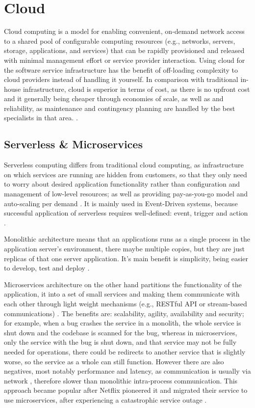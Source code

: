 \section{Cloud}
Cloud computing is a model for enabling convenient, on-demand network access to a shared pool of configurable computing
resources (e.g., networks, servers, storage, applications, and services) that can be rapidly provisioned and released with minimal management effort or service provider interaction. \cite {cloudDef}
Using cloud for the software service infrastructure has the benefit of off-loading complexity to cloud providers instead of handling it yourself. In comparison with traditional in-house infrastructure, cloud is superior in terms of cost, as there is no upfront cost and it generally being cheaper through economies of scale, as well as and reliability, as maintenance and contingency planning are handled by the best specialists in that area.  \cite{armbrust2009above, hajjat2010cloudward}.  
\subsection{Serverless \& Microservices}
Serverless computing differs from traditional cloud computing, as infrastructure on which services are running are hidden from customers, so that they only need to worry about desired application functionality rather than configuration and management of low-level resources; as well as providing pay-as-you-go model and auto-scaling per demand \cite{serverless1}.  It is mainly used in Event-Driven systems, because successful application of serverless requires well-defined: event, trigger and action \cite{MALAWSKI2020502, serverless2}. 

Monolithic architecture means that an applications runs as a single process in the application server's environment, there maybe multiple copies, but they are just replicas of that one server application. It's main benefit is simplicity, being easier to develop, test and deploy \cite{monolith}.

Microservices architecture on the other hand partitions the functionality of the application, it into a set of small services and making them communicate with each other through light weight mechanisms (e.g., RESTful API or stream-based communications) \cite{fowler2014eb}. The benefits are: scalability, agility, availability and security; for example, when a bug crashes the service in a monolith, the whole service is shut down and the codebase is scanned for the bug, whereas in microservices, only the service with the bug is shut down, and that service may not be fully needed for operations, there could be redirects to another service that is slightly worse, so the service as a whole can still function. However there are also negatives, most notably performance and latency, as communication is usually via network \cite{Li2021Understanding}, therefore slower than monolithic intra-process communication. This approach became popular after Netflix pioneered it and migrated their service to use microservices, after experiencing a catastrophic service outage \cite{monolith}.
